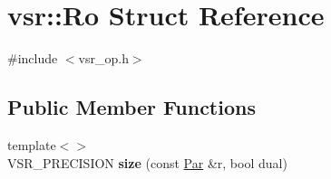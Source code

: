 \hypertarget{structvsr_1_1_ro}{\section{vsr\-:\-:Ro Struct Reference}
\label{structvsr_1_1_ro}
}


{\ttfamily \#include $<$vsr\-\_\-op.\-h$>$}

\subsection*{Public Member Functions}
\begin{DoxyCompactItemize}
\item 
\hypertarget{structvsr_1_1_ro_a4be20b9052e3f09a01c0f9a0f0590106}{{\footnotesize template$<$$>$ }\\V\-S\-R\-\_\-\-P\-R\-E\-C\-I\-S\-I\-O\-N {\bfseries size} (const \hyperlink{namespacevsr_ae046793ece205351429a6346a66fd6eb}{Par} \&r, bool dual)}\label{structvsr_1_1_ro_a4be20b9052e3f09a01c0f9a0f0590106}

\end{DoxyCompactItemize}
